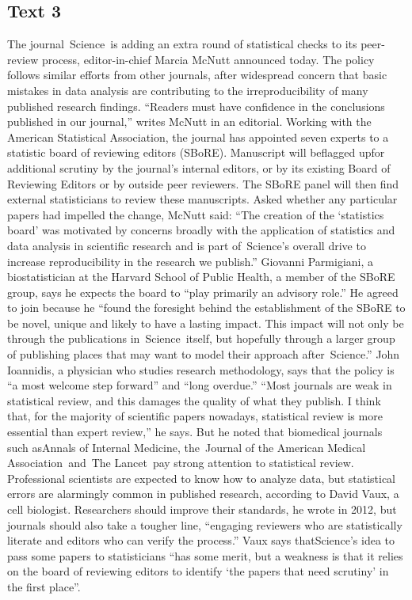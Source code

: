 \subsection{Text 3}
    The journal Science is adding an extra round of statistical checks to its peer-review process, editor-in-chief Marcia McNutt announced today. The policy follows similar efforts from other journals, after widespread concern that basic mistakes in data analysis are contributing to the irreproducibility of many published research findings.
    “Readers must have confidence in the conclusions published in our journal,” writes McNutt in an editorial. Working with the American Statistical Association, the journal has appointed seven experts to a statistic board of reviewing editors (SBoRE). Manuscript will beflagged upfor additional scrutiny by the journal’s internal editors, or by its existing Board of Reviewing Editors or by outside peer reviewers. The SBoRE panel will then find external statisticians to review these manuscripts.
    Asked whether any particular papers had impelled the change, McNutt said: “The creation of the ‘statistics board’ was motivated by concerns broadly with the application of statistics and data analysis in scientific research and is part of Science’s overall drive to increase reproducibility in the research we publish.”
   Giovanni Parmigiani, a biostatistician at the Harvard School of Public Health, a member of the SBoRE group, says he expects the board to “play primarily an advisory role.” He agreed to join because he “found the foresight behind the establishment of the SBoRE to be novel, unique and likely to have a lasting impact. This impact will not only be through the publications in Science itself, but hopefully through a larger group of publishing places that may want to model their approach after Science.”
   John Ioannidis, a physician who studies research methodology, says that the policy is “a most welcome step forward” and “long overdue.” “Most journals are weak in statistical review, and this damages the quality of what they publish. I think that, for the majority of scientific papers nowadays, statistical review is more essential than expert review,” he says. But he noted that biomedical journals such asAnnals of Internal Medicine, the Journal of the American Medical Association and The Lancet pay strong attention to statistical review.
   Professional scientists are expected to know how to analyze data, but statistical errors are alarmingly common in published research, according to David Vaux, a cell biologist. Researchers should improve their standards, he wrote in 2012, but journals should also take a tougher line, “engaging reviewers who are statistically literate and editors who can verify the process.” Vaux says thatScience’s idea to pass some papers to statisticians “has some merit, but a weakness is that it relies on the board of reviewing editors to identify ‘the papers that need scrutiny’ in the first place”.
